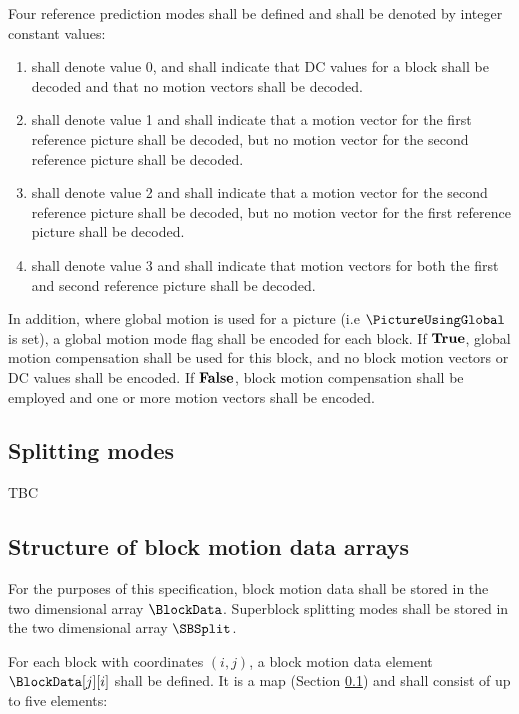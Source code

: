 Four reference prediction modes shall be defined and shall be denoted by integer
constant values: 
\begin{enumerate}
\item \Intra shall denote value 0, and shall indicate that DC values for a block
shall be decoded and that no motion vectors shall be decoded.
\item  \RefOneOnly shall denote value 1 and shall indicate that a motion vector
for the first reference picture shall be decoded, but no motion vector for the second
reference picture shall be decoded.
\item  \RefTwoOnly shall denote value 2 and shall indicate that a motion vector
for the second reference picture shall be decoded, but no motion vector for the first
reference picture shall be decoded.
\item  \RefOneAndTwo shall denote value 3 and shall indicate that motion vectors
for both the first and second reference picture shall be decoded.
\end{enumerate}

In addition, where global motion is used for a picture (i.e $\PictureUsingGlobal$ is set), 
a global motion mode flag shall be encoded for each block. If $\text{\bf{True}}$, global motion
compensation shall be used for this block, and no block motion vectors or DC values
shall be encoded. If $\text{\bf{False}}$, block motion compensation shall be employed and
one or more motion vectors shall be encoded.

\subsection{Splitting modes}

TBC

\subsection{Structure of block motion data arrays}

\label{motionconventions}

For the purposes of this specification, block motion data shall be stored in the 
two dimensional array $\BlockData$. Superblock
splitting modes shall be stored in the two dimensional array $\SBSplit$.

For each block with coordinates $(i,j)$, a block motion data element 
$\BlockData[j][i]$ shall be defined. It is a map (Section \ref{}) and shall
consist of up to five elements:

